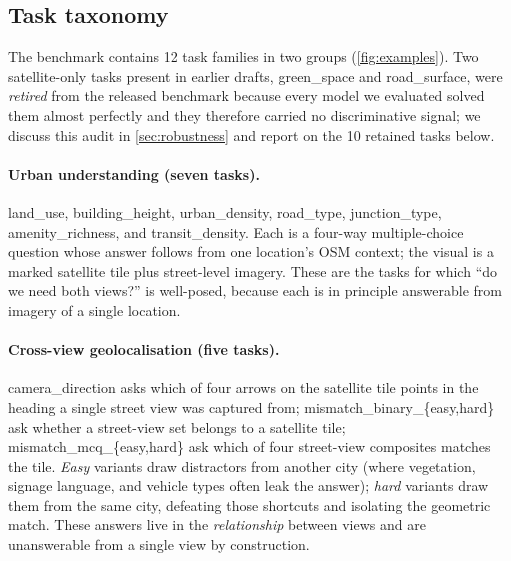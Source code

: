 \subsection{Task taxonomy}
\label{sec:taxonomy}
The benchmark contains \num{12} task families in two groups
(\cref{fig:examples}). Two satellite-only tasks present in earlier drafts,
\textsf{green\_space} and \textsf{road\_surface}, were \emph{retired} from the
released benchmark because every model we evaluated solved them almost perfectly
and they therefore carried no discriminative signal; we discuss this audit in
\cref{sec:robustness} and report on the \num{10} retained tasks below.

\paragraph{Urban understanding (seven tasks).}
\textsf{land\_use}, \textsf{building\_height}, \textsf{urban\_density},
\textsf{road\_type}, \textsf{junction\_type}, \textsf{amenity\_richness}, and
\textsf{transit\_density}. Each is a four-way multiple-choice question whose answer
follows from one location's OSM context; the visual is a marked satellite tile plus
street-level imagery. These are the tasks for which ``do we need both views?'' is
well-posed, because each is in principle answerable from imagery of a single
location.

\paragraph{Cross-view geolocalisation (five tasks).}
\textsf{camera\_direction} asks which of four arrows on the satellite tile points
in the heading a single street view was captured from;
\textsf{mismatch\_binary\_\{easy,hard\}} ask whether a street-view set belongs to a
satellite tile; \textsf{mismatch\_mcq\_\{easy,hard\}} ask which of four street-view
composites matches the tile. \emph{Easy} variants draw distractors from another
city (where vegetation, signage language, and vehicle types often leak the answer);
\emph{hard} variants draw them from the same city, defeating those shortcuts and
isolating the geometric match. These answers live in the \emph{relationship}
between views and are unanswerable from a single view by construction.

